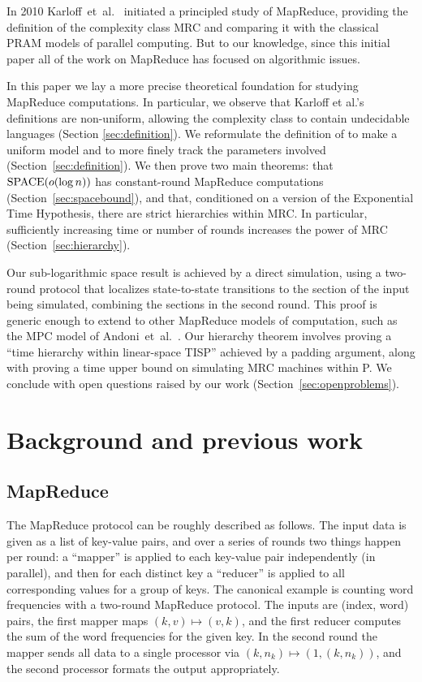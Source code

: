 \documentclass[11pt]{article}
\theoremstyle{definition}
\theoremstyle{remark}
\newcommand{\SPACE}{\textup{SPACE}}
\newcommand{\TISP}{\textup{TISP}}
\begin{document}
In 2010 Karloff~et~al.~\cite{Karloff10} initiated a principled study of
MapReduce, providing the definition of the complexity class MRC and comparing
it with the classical PRAM models of parallel computing. But to our knowledge,
since this initial paper all of the work on MapReduce has focused on
algorithmic issues.

In this paper we lay a more precise theoretical foundation for studying
MapReduce computations. In particular, we observe that Karloff et al.'s
definitions are non-uniform, allowing the complexity class to contain
undecidable languages (Section \ref{sec:definition}). We reformulate the
definition of \cite{Karloff10} to make a uniform model and to more finely track
the parameters involved (Section~\ref{sec:definition}). We then prove two main
theorems: that $\SPACE(o(\log n))$ has constant-round MapReduce computations
(Section~\ref{sec:spacebound}), and that, conditioned on a version of the
Exponential Time Hypothesis, there are strict hierarchies within MRC.  In
particular, sufficiently increasing time or number of rounds increases the
power of MRC (Section~\ref{sec:hierarchy}).

Our sub-logarithmic space result is achieved by a direct simulation, using a
two-round protocol that localizes state-to-state transitions to the section of
the input being simulated, combining the sections in the second round. This
proof is generic enough to extend to other MapReduce models of computation,
such as the MPC model of Andoni~et~al.~\cite{AndoniNOY14}. Our hierarchy
theorem involves proving a ``time hierarchy within linear-space \TISP''
achieved by a padding argument, along with proving a time upper bound on
simulating MRC machines within P.  We conclude with open questions raised by
our work (Section~\ref{sec:openproblems}).


\section{Background and previous work}

\subsection{MapReduce}

The MapReduce protocol can be roughly described as follows. The input data is
given as a list of key-value pairs, and over a series of rounds two things
happen per round: a ``mapper'' is applied to each key-value pair independently
(in parallel), and then for each distinct key a ``reducer'' is applied to all
corresponding values for a group of keys. The canonical example is counting
word frequencies with a two-round MapReduce protocol. The inputs are (index,
word) pairs, the first mapper maps $(k,v) \mapsto (v,k)$, and the first reducer
computes the sum of the word frequencies for the given key. In the second round
the mapper sends all data to a single processor via $(k, n_k) \mapsto (1, (k,
n_k))$, and the second processor formats the output appropriately.
\end{document}
